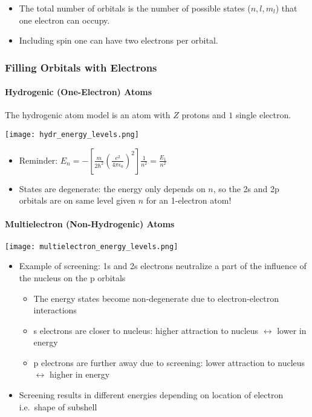 
\begin{itemize}
    \item The total number of orbitals is the number of possible states ($n,l,m_l$) that one electron can occupy.
    \item Including spin one can have two electrons per orbital.
\end{itemize}

\subsubsection{Filling Orbitals with Electrons}
\paragraph{Hydrogenic (One-Electron) Atoms}
The hydrogenic atom model is an atom with $Z$ protons and $1$ single electron.


\begin{center}
    \texttt{[image: hydr\_energy\_levels.png]}
\end{center}
\begin{itemize}
    \item Reminder: $E_n = -\left[\frac{m}{2\hbar^2}{\left(\frac{e^2}{4\pi\epsilon_0}\right)}^2\right]\frac{1}{n^2} = \frac{E_1}{n^2}$
    \item States are degenerate: the energy only depends on $n$, so the 2s and 2p orbitals are on same level given $n$ for an 1-electron atom!
\end{itemize}

\paragraph{Multielectron (Non-Hydrogenic) Atoms}


\begin{center}
    \texttt{[image: multielectron\_energy\_levels.png]}
\end{center}
\begin{itemize}
    \item Example of screening: 1s and 2s electrons neutralize a part of the influence of the nucleus on the p orbitals
          \begin{itemize}
              \item The energy states become non-degenerate due to electron-electron interactions
              \item s electrons are closer to nucleus: higher attraction to nucleus $\leftrightarrow$ lower in energy
              \item p electrons are further away due to screening: lower attraction to nucleus $\leftrightarrow$ higher in energy
          \end{itemize}
    \item Screening results in different energies depending on location of electron i.e.\ shape of subshell
\end{itemize}

